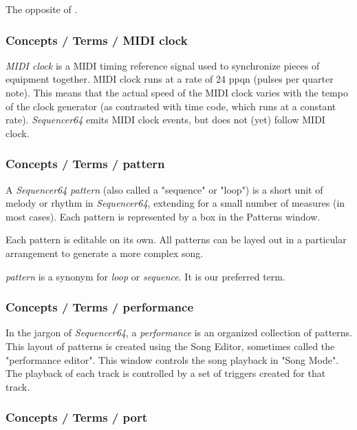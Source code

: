    The opposite of .

\subsubsection{Concepts / Terms / MIDI clock}
\label{subsubsec:concepts_terms_midi_clock}

   \textsl{MIDI clock} is
   a MIDI timing reference signal used to synchronize pieces of equipment
   together. MIDI clock runs at a rate of 24 ppqn (pulses per quarter note).
   This means that the actual speed of the MIDI clock varies with the tempo
   of the clock generator (as contrasted with time code, which runs at a
   constant rate). \textsl{Sequencer64} emits MIDI clock events, but does not
   (yet) follow MIDI clock.

\subsubsection{Concepts / Terms / pattern}
\label{subsubsec:concepts_terms_pattern}

   A \textsl{Sequencer64} \textsl{pattern}
   (also called a "sequence" or "loop")
   is a short unit of melody or rhythm in \textsl{Sequencer64},
   extending for a small number of measures (in most cases).
   Each pattern is represented by a box in the Patterns window.

   Each pattern is editable on its own.  All patterns can be layed out in
   a particular arrangement to generate a more complex song.

   \textsl{pattern} is a synonym for \textsl{loop} or \textsl{sequence}.
   It is our preferred term.

\subsubsection{Concepts / Terms / performance}
\label{subsubsec:concepts_terms_performance}

   In the jargon of \textsl{Sequencer64}, a
   \textsl{performance} is an organized collection of patterns.
   This layout of patterns is created using the Song Editor, sometimes
   called the "performance editor".
   This window controls the song playback in "Song Mode".
   The playback of each track is controlled by a set of triggers created for
   that track.

\subsubsection{Concepts / Terms / port}
\label{subsubsec:concepts_terms_port}

